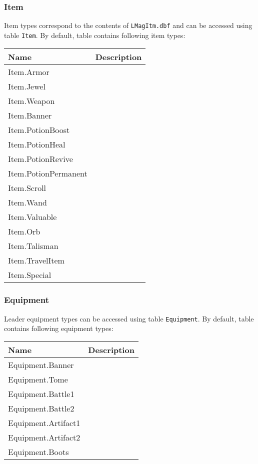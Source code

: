 \subsubsection{Item}
\label{ItemCategory}
Item types correspond to the contents of \texttt{LMagItm.dbf} and can be accessed using table \texttt{Item}.
By default, table contains following item types:\\
\begin{tabularx}{\linewidth}{| l | X |}
\hline
\textbf{Name} & \textbf{Description} \\
\hline
Item.Armor &\\
\hline
Item.Jewel &\\
\hline
Item.Weapon &\\
\hline
Item.Banner &\\
\hline
Item.PotionBoost &\\
\hline
Item.PotionHeal &\\
\hline
Item.PotionRevive &\\
\hline
Item.PotionPermanent &\\
\hline
Item.Scroll &\\
\hline
Item.Wand &\\
\hline
Item.Valuable &\\
\hline
Item.Orb &\\
\hline
Item.Talisman &\\
\hline
Item.TravelItem &\\
\hline
Item.Special &\\
\hline
\end{tabularx}

\subsubsection{Equipment}
\label{EquipmentCategory}
Leader equipment types can be accessed using table \texttt{Equipment}.
By default, table contains following equipment types:\\
\begin{tabularx}{\linewidth}{| l | X |}
\hline
\textbf{Name} & \textbf{Description} \\
\hline
Equipment.Banner &\\
\hline
Equipment.Tome &\\
\hline
Equipment.Battle1 &\\
\hline
Equipment.Battle2 &\\
\hline
Equipment.Artifact1 &\\
\hline
Equipment.Artifact2 &\\
\hline
Equipment.Boots &\\
\hline
\end{tabularx}

